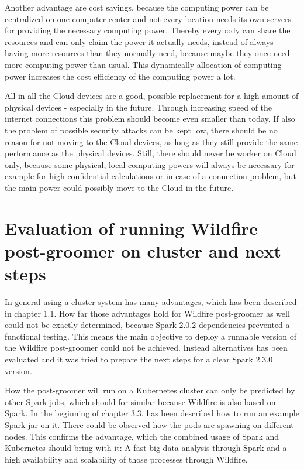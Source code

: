 Another advantage are cost savings, because the computing power can be centralized on one computer center and not every location needs its own servers for providing the necessary computing power. Thereby everybody can share the resources and can only claim the power it actually needs, instead of always having more resources than they normally need, because maybe they once need more computing power than usual. This dynamically allocation of computing power increases the cost efficiency of the computing power a lot.

All in all the Cloud devices are a good, possible replacement for a high amount of physical devices - especially in the future. Through increasing speed of the internet connections this problem should become even smaller than today. If also the problem of possible security attacks can be kept low, there should be no reason for not moving to the Cloud devices, as long as they still provide the same performance as the physical devices. Still, there should never be worker on Cloud only, because some physical, local computing powers will always be necessary for example for high confidential calculations or in case of a connection problem, but the main power could possibly move to the Cloud in the future.

\section{Evaluation of running Wildfire post-groomer on cluster and next steps}

In general using a cluster system has many advantages, which has been described in chapter 1.1. How far those advantages hold for Wildfire post-groomer as well could not be exactly determined, because Spark 2.0.2 dependencies prevented a functional testing. This means the main objective to deploy a runnable version of the Wildfire post-groomer could not be achieved. Instead alternatives has been evaluated and it was tried to prepare the next steps for a clear Spark 2.3.0 version.

How the post-groomer will run on a Kubernetes cluster can only be predicted by other Spark jobs, which should for similar because Wildfire is also based on Spark. In the beginning of chapter 3.3. has been described how to run an example Spark jar on it. There could be observed how the pods are spawning on different nodes. This confirms the advantage, which the combined usage of Spark and Kubernetes should bring with it: A fast big data analysis through Spark and a high availability and scalability of those processes through Wildfire.


